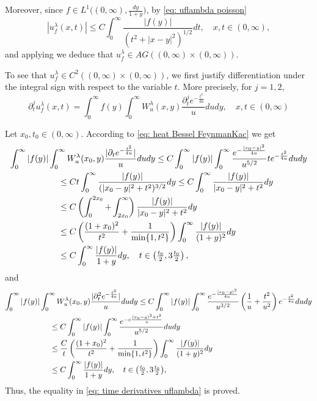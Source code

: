 \documentclass[a4paper,10pt, reqno]{amsart}
\theoremstyle{definition}
\theoremstyle{remark}
\numberwithin{equation}{section}
\begin{document}
Moreover, since $f\in L^1\big((0,\infty),\frac{dy}{1+y}\big)$, by \eqref{eq: uflambda poisson}
\[
|u_f^\lambda (x,t)|\leq C\int_0^\infty \frac{|f(y)|}{(t^2+|x-y|^2)^{1/2}}dt,\quad x,t\in (0,\infty),
\]
and applying \cite[Theorem 3.1, $(i)\Rightarrow (ii)$]{ChHW} we deduce that $u_f^\lambda\in AG((0,\infty)\times (0,\infty))$.

To see that $u_f^\lambda\in C^2((0,\infty)\times (0,\infty))$, we first justify differentiation under the integral sign with respect to the variable $t$. More precisely, for $j=1,2$,
\begin{equation}\label{eq: time derivatives uflambda}
\partial_t^ju_f^\lambda (x,t)=\int_0^\infty f(y)\int_0^\infty W_u^\lambda (x,y)\frac{\partial_t^je^{-\frac{t^2}{4u}}}{u}dudy,\quad x,t\in (0,\infty)
\end{equation}

Let $x_0,t_0\in (0,\infty)$. According to \eqref{eq: heat Bessel FeynmanKac} we get
\begin{align*}
    \int_0^\infty |f(y)|\int_0^\infty W_u^\lambda (x_0,y)\frac{|\partial_te^{-\frac{t^2}{4u}}|}{u}dudy&\leq C \int_0^\infty |f(y)|\int_0^\infty \frac{e^{-\frac{|x_0-y|^2}{4u}}}{u^{5/2}}te^{-\frac{t^2}{4u}}dudy\\
    &\hspace{-4cm}\leq Ct\int_0^\infty \frac{|f(y)|}{(|x_0-y|^2+t^2)^{3/2}}dy\leq C\int_0^\infty \frac{|f(y)|}{|x_0-y|^2+t^2}dy\\
    &\hspace{-4cm}\leq C\left(\int_0^{2x_0}+\int_{2x_0}^\infty\right)\frac{|f(y)|}{|x_0-y|^2+t^2}dy\\
    &\hspace{-4cm}\leq C\left(\frac{(1+x_0)^2}{t^2}+\frac{1}{\min\{1,t^2\}}\right)\int_0^\infty \frac{|f(y)|}{(1+y)^2}dy\\
    &\hspace{-4cm}\leq C\int_0^\infty \frac{|f(y)|}{1+y}dy,\quad t\in \left(\tfrac{t_0}{2},3\tfrac{t_0}{2}\right),
\end{align*}
and
\begin{align*}
    \int_0^\infty |f(y)|\int_0^\infty W_u^\lambda (x_0, y)\frac{|\partial_t^2e^{-\frac{t^2}{4u}}|}{u}dudy&\leq C \int_0^\infty |f(y)|\int_0^\infty \frac{e^{-\frac{|x_0-y|^2}{4u}}}{u^{3/2}}\left(\frac{1}{u}+\frac{t^2}{u^2}\right)e^{-\frac{t^2}{4u}}dudy\\
    &\hspace{-4cm}\leq C\int_0^\infty |f(y)|\int_0^\infty \frac{e^{-c\frac{(x_0-y)^2+t^2}{u}}}{u^{5/2}}dudy\\
    &\hspace{-4cm}\leq \frac{C}{t}\left(\frac{(1+x_0)^2}{t^2}+\frac{1}{\min\{1,t^2\}}\right)\int_0^\infty \frac{|f(y)|}{(1+y)^2}dy\\
    &\hspace{-4cm}\leq C\int_0^\infty \frac{|f(y)|}{1+y}dy,\quad t\in \big(\tfrac{t_0}{2},3\tfrac{t_0}{2}\big),
\end{align*}
Thus, the equality in \eqref{eq: time derivatives uflambda} is proved.
\end{document}
